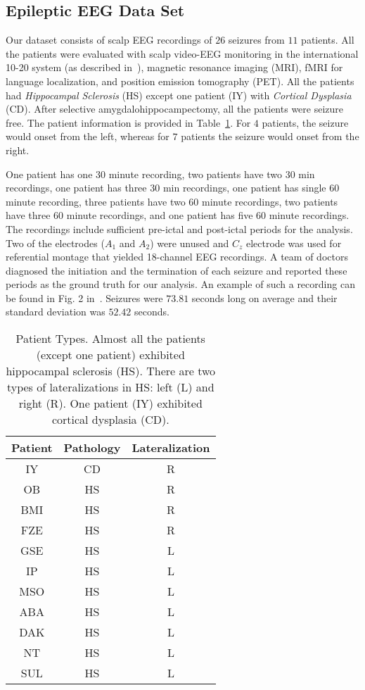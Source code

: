 \documentclass{article} %
\theoremstyle{definition}
\theoremstyle{remark}
\begin{document}
\subsection{Epileptic EEG Data Set} \label{sec:eeg_data}
Our dataset consists of scalp EEG recordings of $26$ seizures from $11$ patients.  All the patients were evaluated with scalp video-EEG monitoring in the international 10-20 system (as described in~\cite{jasper_1020}), magnetic resonance imaging (MRI), fMRI for language localization, and position emission tomography (PET).  All the patients had {\em Hippocampal Sclerosis} (HS) except one patient (IY) with {\em Cortical Dysplasia} (CD). After selective amygdalohippocampectomy, all the patients were seizure free.  The patient information is provided in Table~\ref{tab:patient_types}.  For $4$ patients, the seizure would onset from the left, whereas for $7$ patients the seizure would onset from the right. 

One patient has one $30$ minute recording, two patients have two $30$ min recordings, one patient has three $30$ min recordings, one 
patient has single $60$ minute recording, three patients have two $60$ minute recordings, two patients have three $60$ minute recordings, and one patient has five $60$ minute recordings.  The recordings include sufficient \mbox{pre-ictal} and \mbox{post-ictal} periods for the  analysis. Two of the electrodes ($A_1$  and $A_2$) were unused and  $C_z$ electrode was used for referential montage that yielded \mbox{18-channel} EEG
recordings.  A team of doctors diagnosed the initiation and the termination of each seizure and reported these periods as the ground truth for our
analysis.  An example of such a recording can be found in Fig. 2 in~\cite{smith_eegrecording}.  Seizures were $73.81$ seconds long on average and their standard deviation was $52.42$ seconds.

\begin{table}[htdp]
\caption{Patient Types. Almost all the patients (except one patient) exhibited hippocampal sclerosis (HS).  
There are two types of lateralizations in HS: left (L) and right (R).  One patient (IY) 
exhibited cortical dysplasia (CD).}
\renewcommand{\arraystretch}{0.9}
\begin{center}
\begin{tabular}{ccc}
	Patient & Pathology & Lateralization\\
	\hline
	IY&CD&R\\
	OB&HS&R\\
	BMI&HS&R\\
	FZE&HS&R\\
	GSE&HS&L\\
	IP&HS&L\\
	MSO	&HS&L\\	
	ABA&HS&L\\
	DAK&HS&L\\
	NT&HS&L\\
	SUL&HS&L\\
\end{tabular}
\end{center}
\label{tab:patient_types}
\end{table}
\end{document}

